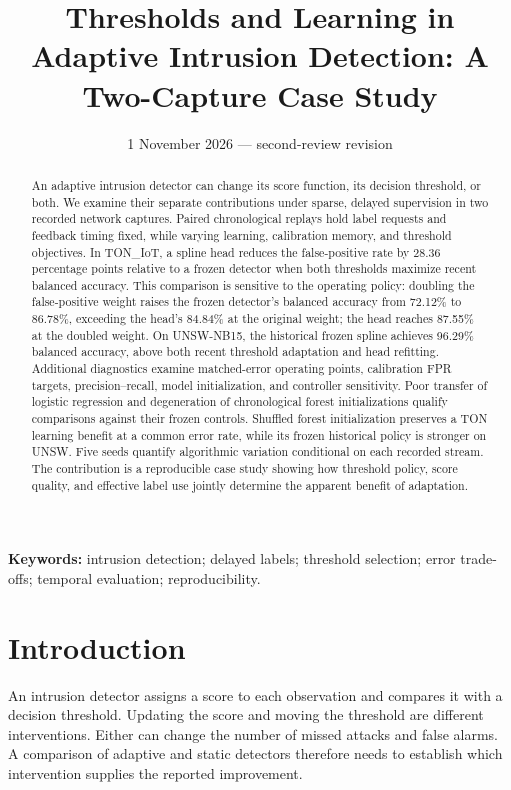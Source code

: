 
\title{\vspace{-12mm}\textbf{Thresholds and Learning in Adaptive Intrusion Detection: A Two-Capture Case Study}}

\date{1 November 2026 --- second-review revision}

\maketitle\thispagestyle{plain}
\begin{abstract}
An adaptive intrusion detector can change its score function, its decision threshold, or both. We examine their separate contributions under sparse, delayed supervision in two recorded network captures. Paired chronological replays hold label requests and feedback timing fixed, while varying learning, calibration memory, and threshold objectives. In TON\_IoT, a spline head reduces the false-positive rate by 28.36 percentage points relative to a frozen detector when both thresholds maximize recent balanced accuracy. This comparison is sensitive to the operating policy: doubling the false-positive weight raises the frozen detector's balanced accuracy from 72.12\% to 86.78\%, exceeding the head's 84.84\% at the original weight; the head reaches 87.55\% at the doubled weight. On UNSW-NB15, the historical frozen spline achieves 96.29\% balanced accuracy, above both recent threshold adaptation and head refitting. Additional diagnostics examine matched-error operating points, calibration FPR targets, precision--recall, model initialization, and controller sensitivity. Poor transfer of logistic regression and degeneration of chronological forest initializations qualify comparisons against their frozen controls. Shuffled forest initialization preserves a TON learning benefit at a common error rate, while its frozen historical policy is stronger on UNSW. Five seeds quantify algorithmic variation conditional on each recorded stream. The contribution is a reproducible case study showing how threshold policy, score quality, and effective label use jointly determine the apparent benefit of adaptation.
\end{abstract}
\noindent\textbf{Keywords:} intrusion detection; delayed labels; threshold selection; error trade-offs; temporal evaluation; reproducibility.

\section{Introduction}
An intrusion detector assigns a score to each observation and compares it with a decision threshold. Updating the score and moving the threshold are different interventions. Either can change the number of missed attacks and false alarms. A comparison of adaptive and static detectors therefore needs to establish which intervention supplies the reported improvement.

